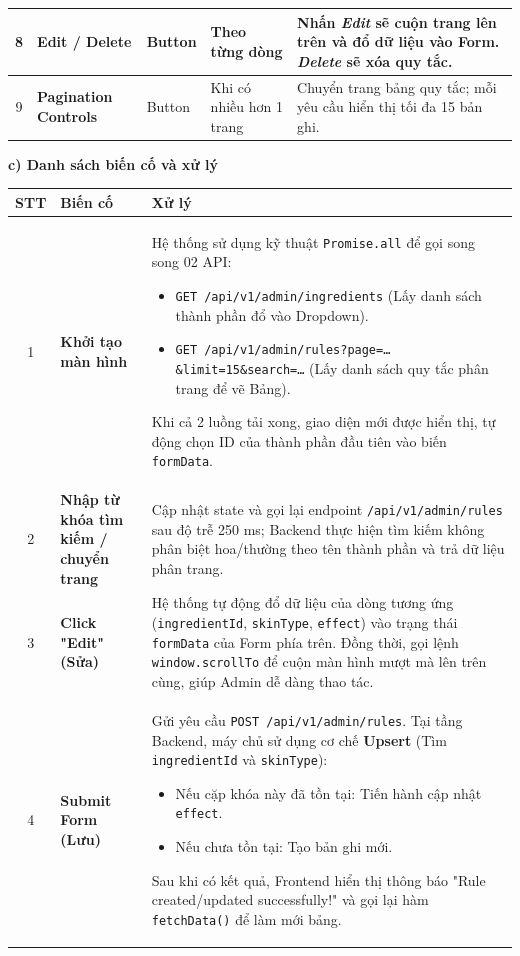 \documentclass[12pt,a4paper]{article}
\begin{document}
\begin{center}
\begin{tabularx}{\textwidth}{|c|l|l|l|X|}
8 & \textbf{Edit / Delete} & Button & Theo từng dòng & Nhấn \textit{Edit} sẽ cuộn trang lên trên và đổ dữ liệu vào Form. \textit{Delete} sẽ xóa quy tắc. \\ \hline

9 & \textbf{Pagination Controls} & Button & Khi có nhiều hơn 1 trang & Chuyển trang bảng quy tắc; mỗi yêu cầu hiển thị tối đa 15 bản ghi. \\ \hline

\end{tabularx}
\end{center}

\textbf{c) Danh sách biến cố và xử lý}

\begin{center}
\renewcommand{\arraystretch}{1.5}
\begin{tabularx}{\textwidth}{|c|l|X|}
\hline
\rowcolor{blue!20}
\textbf{STT} & \textbf{Biến cố} & \textbf{Xử lý} \\ \hline

1 & \textbf{Khởi tạo màn hình} & 
Hệ thống sử dụng kỹ thuật \texttt{Promise.all} để gọi song song 02 API:
\begin{itemize}
    \item \texttt{GET /api/v1/admin/ingredients} (Lấy danh sách thành phần đổ vào Dropdown).
    \item \texttt{GET /api/v1/admin/rules?page=\ldots\&limit=15\&search=\ldots} (Lấy danh sách quy tắc phân trang để vẽ Bảng).
\end{itemize}
Khi cả 2 luồng tải xong, giao diện mới được hiển thị, tự động chọn ID của thành phần đầu tiên vào biến \texttt{formData}. \\ \hline

2 & \textbf{Nhập từ khóa tìm kiếm / chuyển trang} & Cập nhật state và gọi lại endpoint \texttt{/api/v1/admin/rules} sau độ trễ 250 ms; Backend thực hiện tìm kiếm không phân biệt hoa/thường theo tên thành phần và trả dữ liệu phân trang. \\ \hline

3 & \textbf{Click "Edit" (Sửa)} & Hệ thống tự động đổ dữ liệu của dòng tương ứng (\texttt{ingredientId}, \texttt{skinType}, \texttt{effect}) vào trạng thái \texttt{formData} của Form phía trên. Đồng thời, gọi lệnh \texttt{window.scrollTo} để cuộn màn hình mượt mà lên trên cùng, giúp Admin dễ dàng thao tác. \\ \hline

4 & \textbf{Submit Form (Lưu)} & 
Gửi yêu cầu \texttt{POST /api/v1/admin/rules}. Tại tầng Backend, máy chủ sử dụng cơ chế \textbf{Upsert} (Tìm \texttt{ingredientId} và \texttt{skinType}):
\begin{itemize}
    \item Nếu cặp khóa này đã tồn tại: Tiến hành cập nhật \texttt{effect}.
    \item Nếu chưa tồn tại: Tạo bản ghi mới.
\end{itemize}
Sau khi có kết quả, Frontend hiển thị thông báo "Rule created/updated successfully!" và gọi lại hàm \texttt{fetchData()} để làm mới bảng. \\ \hline


\end{tabularx}
\end{center}
\end{document}
